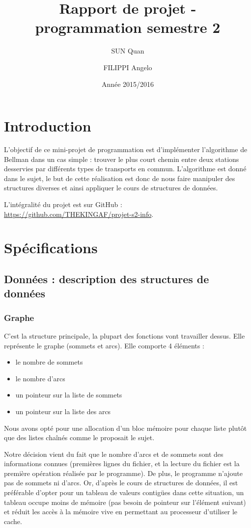 \documentclass{report}
\title{Rapport de projet - programmation semestre 2}
\author{SUN Quan \and FILIPPI Angelo}
\date{Année 2015/2016}
\begin{document}
\maketitle

\tableofcontents

\chapter{Introduction}\indent

L’objectif de ce mini-projet de programmation est d’implémenter l’algorithme de Bellman dans un cas simple : trouver le plus court chemin entre deux stations desservies par différents types de transports en commun. L’algorithme est donné dans le sujet, le but de cette réalisation est donc de nous faire manipuler des structures diverses et ainsi appliquer le cours de structures de données.

L'intégralité du projet est sur GitHub : \url{https://github.com/THEKINGAF/projet-s2-info}.

\chapter{Spécifications}
\section{Données : description des structures de données}
\subsection{Graphe}

C’est la structure principale, la plupart des fonctions vont travailler dessus. Elle représente le graphe (sommets et arcs).
Elle comporte 4 éléments :

\begin{itemize}
\item le nombre de sommets
\item le nombre d’arcs
\item un pointeur sur la liste de sommets
\item un pointeur sur la liste des arcs
\end{itemize}

\bigskip 
Nous avons opté pour une allocation d’un bloc mémoire pour chaque liste plutôt que des listes chaînés comme le proposait le sujet. 

Notre décision vient du fait que le nombre d’arcs et de sommets sont des informations connues (premières lignes du fichier, et la lecture du fichier est la première opération réalisée par le programme). De plus, le programme n’ajoute pas de sommets ni d’arcs. Or, d’après le cours de structures de données, il est préférable d’opter pour un tableau de valeurs contigües dans cette situation, un tableau occupe moins de mémoire (pas besoin de pointeur sur l’élément suivant) et réduit les accès à la mémoire vive en permettant au processeur d’utiliser le cache.
\end{document}
